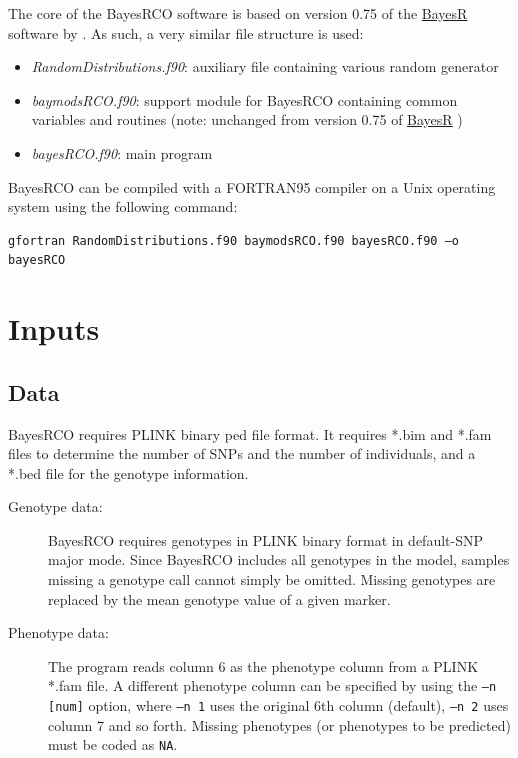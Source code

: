 \documentclass{ol-softwaremanual}
\begin{document}
The core of the BayesRCO software is based on version 0.75 of the \href{https://github.com/syntheke/bayesR/tree/master/old}{BayesR} software by \citet{moser_simultaneous_2015}. As such, a very similar file structure is used: \\
\begin{itemize}
    \item {\it RandomDistributions.f90}: auxiliary file containing various random generator %
 \item {\it baymodsRCO.f90}: support module for BayesRCO containing common variables and routines (note: unchanged from version 0.75 of \href{https://github.com/syntheke/bayesR/tree/master/old}{BayesR} 
)
\item {\it bayesRCO.f90}: main program 
\end{itemize}
BayesRCO can be compiled with a FORTRAN95 compiler on a Unix operating system using the following command:
\noindent\begin{verbatim}
gfortran RandomDistributions.f90 baymodsRCO.f90 bayesRCO.f90 –o bayesRCO
\end{verbatim}

\section{Inputs}

\subsection{Data}

BayesRCO requires PLINK binary ped file format. It requires *.bim and *.fam files to determine the number of SNPs and the number of individuals, and a *.bed file for the genotype information.  
\begin{description}
\item[Genotype data:] BayesRCO requires genotypes in PLINK binary format in default-SNP major mode. Since BayesRCO includes all genotypes in the model, samples missing a genotype call cannot simply be omitted. Missing genotypes are replaced by the mean genotype value of a given marker.
\item[Phenotype data:] The program reads column 6 as the phenotype column from a PLINK *.fam file. A different phenotype column can be specified by using the  \texttt{–n [num]} option, where \texttt{–n 1} uses the original 6th column (default), \texttt{–n 2} uses column 7 and so forth. Missing phenotypes (or phenotypes to be predicted) must be coded as \texttt{NA}.
\end{description}
\end{document}
